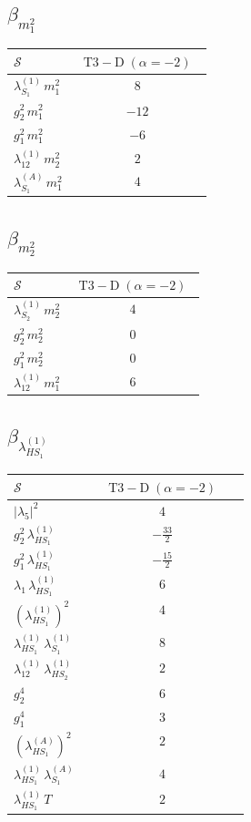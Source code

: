 \documentclass[9pt]{article}
\begin{document}
\subsection*{$ \beta_{m_1^{2}} $}
\begin{longtable}{@{}p{0.31\linewidth}c@{}}
\toprule
$\mathcal{S}$ & $ \mathrm{T3-D}\;(\alpha=-2) $ \\
\midrule
$ \lambda_{S_1}^{(1)}\,m_1^{2} $ & $ 8 $ \\
$ g_2^2\,m_1^{2} $ & $ -12 $ \\
$ g_1^2\,m_1^{2} $ & $ -6 $ \\
$ \lambda_{12}^{(1)}\,m_2^{2} $ & $ 2 $ \\
$ \lambda_{S_1}^{(A)}\,m_1^{2} $ & $ 4 $ \\
\bottomrule
\end{longtable}
\subsection*{$ \beta_{m_2^{2}} $}
\begin{longtable}{@{}p{0.31\linewidth}c@{}}
\toprule
$\mathcal{S}$ & $ \mathrm{T3-D}\;(\alpha=-2) $ \\
\midrule
$ \lambda_{S_2}^{(1)}\,m_2^{2} $ & $ 4 $ \\
$ g_2^2\,m_2^{2} $ & $ 0 $ \\
$ g_1^2\,m_2^{2} $ & $ 0 $ \\
$ \lambda_{12}^{(1)}\,m_1^{2} $ & $ 6 $ \\
\bottomrule
\end{longtable}
\subsection*{$ \beta_{\lambda_{HS_1}^{(1)}} $}
\begin{longtable}{@{}p{0.31\linewidth}c@{}}
\toprule
$\mathcal{S}$ & $ \mathrm{T3-D}\;(\alpha=-2) $ \\
\midrule
$ |\lambda_5|^2 $ & $ 4 $ \\
$ g_2^2\,\lambda_{HS_1}^{(1)} $ & $ - \frac{33}{2} $ \\
$ g_1^2\,\lambda_{HS_1}^{(1)} $ & $ - \frac{15}{2} $ \\
$ \lambda_1\,\lambda_{HS_1}^{(1)} $ & $ 6 $ \\
$ \left(\lambda_{HS_1}^{(1)}\right)^2 $ & $ 4 $ \\
$ \lambda_{HS_1}^{(1)}\,\lambda_{S_1}^{(1)} $ & $ 8 $ \\
$ \lambda_{12}^{(1)}\,\lambda_{HS_2}^{(1)} $ & $ 2 $ \\
$ g_2^4 $ & $ 6 $ \\
$ g_1^4 $ & $ 3 $ \\
$ \left(\lambda_{HS_1}^{(A)}\right)^2 $ & $ 2 $ \\
$ \lambda_{HS_1}^{(1)}\,\lambda_{S_1}^{(A)} $ & $ 4 $ \\
$ \lambda_{HS_1}^{(1)}\,T $ & $ 2 $ \\
\bottomrule
\end{longtable}
\end{document}
